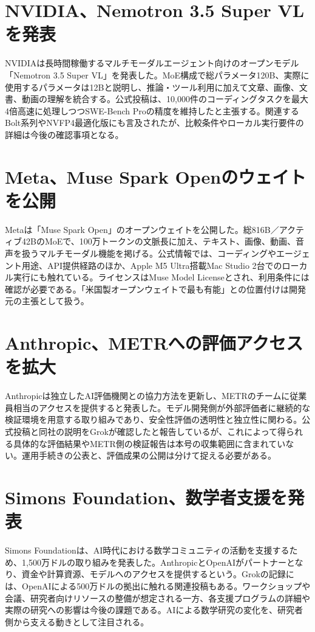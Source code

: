 \section{NVIDIA、Nemotron 3.5 Super VLを発表}
NVIDIAは長時間稼働するマルチモーダルエージェント向けのオープンモデル「Nemotron 3.5 Super VL」を発表した。MoE構成で総パラメータ120B、実際に使用するパラメータは12Bと説明し、推論・ツール利用に加えて文章、画像、文書、動画の理解を統合する。公式投稿は、10,000件のコーディングタスクを最大4倍高速に処理しつつSWE-Bench Proの精度を維持したと主張する。関連するBolt系列やNVFP4最適化版にも言及されたが、比較条件やローカル実行要件の詳細は今後の確認事項となる。

\section{Meta、Muse Spark Openのウェイトを公開}
Metaは「Muse Spark Open」のオープンウェイトを公開した。総816B／アクティブ42BのMoEで、100万トークンの文脈長に加え、テキスト、画像、動画、音声を扱うマルチモーダル機能を掲げる。公式情報では、コーディングやエージェント用途、API提供経路のほか、Apple M5 Ultra搭載Mac Studio 2台でのローカル実行にも触れている。ライセンスはMuse Model Licenseとされ、利用条件には確認が必要である。「米国製オープンウェイトで最も有能」との位置付けは開発元の主張として扱う。

\section{Anthropic、METRへの評価アクセスを拡大}
Anthropicは独立したAI評価機関との協力方法を更新し、METRのチームに従業員相当のアクセスを提供すると発表した。モデル開発側が外部評価者に継続的な検証環境を用意する取り組みであり、安全性評価の透明性と独立性に関わる。公式投稿と同社の説明をGrokが確認したと報告しているが、これによって得られる具体的な評価結果やMETR側の検証報告は本号の収集範囲に含まれていない。運用手続きの公表と、評価成果の公開は分けて捉える必要がある。

\section{Simons Foundation、数学者支援を発表}
Simons Foundationは、AI時代における数学コミュニティの活動を支援するため、1,500万ドルの取り組みを発表した。AnthropicとOpenAIがパートナーとなり、資金や計算資源、モデルへのアクセスを提供するという。Grokの記録には、OpenAIによる500万ドルの拠出に触れる関連投稿もある。ワークショップや会議、研究者向けリソースの整備が想定される一方、各支援プログラムの詳細や実際の研究への影響は今後の課題である。AIによる数学研究の変化を、研究者側から支える動きとして注目される。

